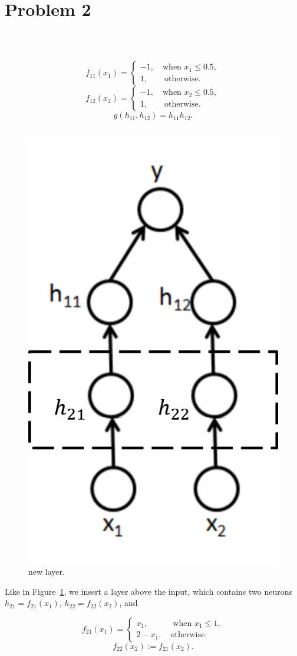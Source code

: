 \section{Problem 2}~\label{sec:prob2}

\subsection{} %

\begin{equation}
    f_{11}(x_1) = \begin{cases}
            -1, \quad \text{when }x_1\le 0.5, \\
            1, \quad\quad \text{otherwise}.
        \end{cases}
\end{equation}
\begin{equation}
    f_{12}(x_2) = \begin{cases}
            -1, \quad \text{when }x_2\le 0.5, \\
            1, \quad\quad \text{otherwise}.
        \end{cases}
\end{equation}
\begin{equation}
    g(h_{11}, h_{12}) = h_{11} h_{12}.
\end{equation}

\subsection{} %

\begin{figure}
    \centering
    \includegraphics[width=0.25\linewidth]{fig/insert.png}
    \caption{\small
    new layer.}
    \label{fig:insert}
\end{figure}

Like in Figure~\ref{fig:insert},
we insert a layer above the input,
which contains two neurons
$h_{21}=f_{21}(x_1)$,
$h_{22}=f_{22}(x_2)$, and


\begin{equation}
    f_{21}(x_1) = \begin{cases}
            x_1, \quad\quad\quad \text{when }x_1\le 1, \\
            2-x_1, \quad \text{otherwise}.
        \end{cases}
\end{equation}
\begin{equation}
    f_{22}(x_2) := f_{21}(x_2).
\end{equation}
